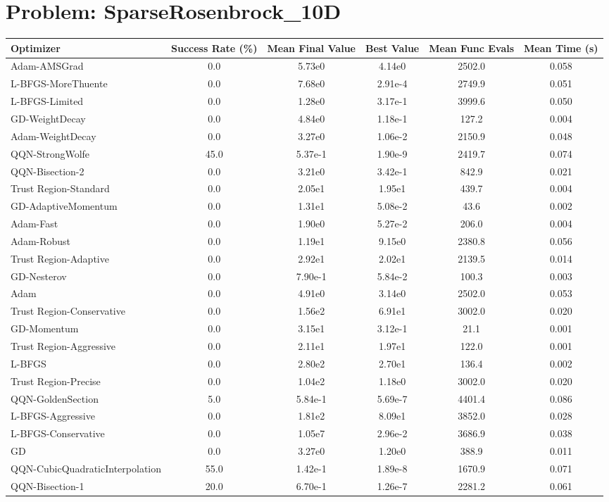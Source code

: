 \documentclass{article}
\begin{document}
\section{Problem: SparseRosenbrock\_10D}
\begin{longtable}{p{3cm}*{5}{c}}
\toprule
\textbf{Optimizer} & \textbf{Success Rate (\%)} & \textbf{Mean Final Value} & \textbf{Best Value} & \textbf{Mean Func Evals} & \textbf{Mean Time (s)} \\
\midrule
Adam-AMSGrad & 0.0 & 5.73e0 & 4.14e0 & 2502.0 & 0.058 \\
L-BFGS-MoreThuente & 0.0 & 7.68e0 & 2.91e-4 & 2749.9 & 0.051 \\
L-BFGS-Limited & 0.0 & 1.28e0 & 3.17e-1 & 3999.6 & 0.050 \\
GD-WeightDecay & 0.0 & 4.84e0 & 1.18e-1 & 127.2 & 0.004 \\
Adam-WeightDecay & 0.0 & 3.27e0 & 1.06e-2 & 2150.9 & 0.048 \\
QQN-StrongWolfe & 45.0 & 5.37e-1 & 1.90e-9 & 2419.7 & 0.074 \\
QQN-Bisection-2 & 0.0 & 3.21e0 & 3.42e-1 & 842.9 & 0.021 \\
Trust Region-Standard & 0.0 & 2.05e1 & 1.95e1 & 439.7 & 0.004 \\
GD-AdaptiveMomentum & 0.0 & 1.31e1 & 5.08e-2 & 43.6 & 0.002 \\
Adam-Fast & 0.0 & 1.90e0 & 5.27e-2 & 206.0 & 0.004 \\
Adam-Robust & 0.0 & 1.19e1 & 9.15e0 & 2380.8 & 0.056 \\
Trust Region-Adaptive & 0.0 & 2.92e1 & 2.02e1 & 2139.5 & 0.014 \\
GD-Nesterov & 0.0 & 7.90e-1 & 5.84e-2 & 100.3 & 0.003 \\
Adam & 0.0 & 4.91e0 & 3.14e0 & 2502.0 & 0.053 \\
Trust Region-Conservative & 0.0 & 1.56e2 & 6.91e1 & 3002.0 & 0.020 \\
GD-Momentum & 0.0 & 3.15e1 & 3.12e-1 & 21.1 & 0.001 \\
Trust Region-Aggressive & 0.0 & 2.11e1 & 1.97e1 & 122.0 & 0.001 \\
L-BFGS & 0.0 & 2.80e2 & 2.70e1 & 136.4 & 0.002 \\
Trust Region-Precise & 0.0 & 1.04e2 & 1.18e0 & 3002.0 & 0.020 \\
QQN-GoldenSection & 5.0 & 5.84e-1 & 5.69e-7 & 4401.4 & 0.086 \\
L-BFGS-Aggressive & 0.0 & 1.81e2 & 8.09e1 & 3852.0 & 0.028 \\
L-BFGS-Conservative & 0.0 & 1.05e7 & 2.96e-2 & 3686.9 & 0.038 \\
GD & 0.0 & 3.27e0 & 1.20e0 & 388.9 & 0.011 \\
QQN-CubicQuadraticInterpolation & 55.0 & 1.42e-1 & 1.89e-8 & 1670.9 & 0.071 \\
QQN-Bisection-1 & 20.0 & 6.70e-1 & 1.26e-7 & 2281.2 & 0.061 \\
\bottomrule
\end{longtable}
\end{document}
